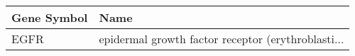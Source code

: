 \begin{tabular}{ll}
\toprule
Gene Symbol &                                               Name \\
\midrule
       EGFR & epidermal growth factor receptor (erythroblasti... \\
\bottomrule
\end{tabular}
